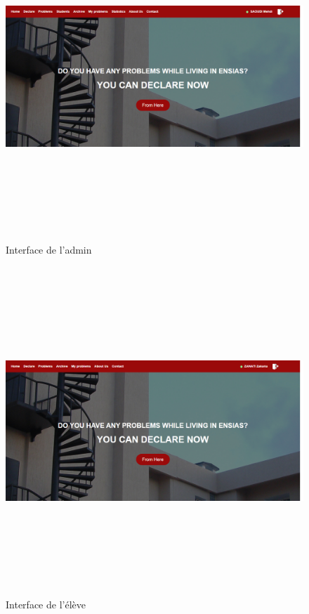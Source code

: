 \documentclass[11.5pt]{report}
\begin{document}
\newpage
\begin{figure}[h]
	
	\begin{center}
		\includegraphics[width=500pt,height=350pt]{home-admin.png} 
		\caption{Interface de l'admin}
	\end{center}
	
\end{figure}
\newpage
\begin{figure}[h]
	
	\begin{center}
		\includegraphics[width=500pt,height=350pt]{home-eleve.png} 
		\caption{Interface de l'élève}
	\end{center}
	
\end{figure}
\end{document}
